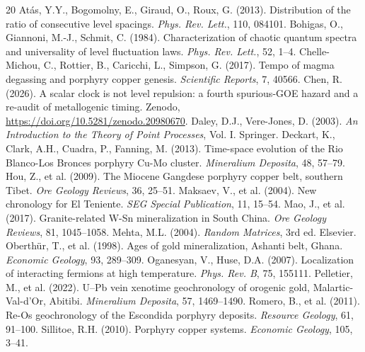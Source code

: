 \documentclass[12pt,a4paper]{article}
\begin{document}
\begin{thebibliography}{20}
 At\'as, Y.Y., Bogomolny, E., Giraud, O., Roux, G. (2013). Distribution of the ratio of consecutive level spacings. \textit{Phys. Rev. Lett.}, 110, 084101.
 Bohigas, O., Giannoni, M.-J., Schmit, C. (1984). Characterization of chaotic quantum spectra and universality of level fluctuation laws. \textit{Phys. Rev. Lett.}, 52, 1--4.
 Chelle-Michou, C., Rottier, B., Caricchi, L., Simpson, G. (2017). Tempo of magma degassing and porphyry copper genesis. \textit{Scientific Reports}, 7, 40566.
 Chen, R. (2026). A scalar clock is not level repulsion: a fourth spurious-GOE hazard and a re-audit of metallogenic timing. Zenodo, \url{https://doi.org/10.5281/zenodo.20980670}.
 Daley, D.J., Vere-Jones, D. (2003). \textit{An Introduction to the Theory of Point Processes}, Vol. I. Springer.
 Deckart, K., Clark, A.H., Cuadra, P., Fanning, M. (2013). Time-space evolution of the Rio Blanco-Los Bronces porphyry Cu-Mo cluster. \textit{Mineralium Deposita}, 48, 57--79.
 Hou, Z., et al. (2009). The Miocene Gangdese porphyry copper belt, southern Tibet. \textit{Ore Geology Reviews}, 36, 25--51.
 Maksaev, V., et al. (2004). New chronology for El Teniente. \textit{SEG Special Publication}, 11, 15--54.
 Mao, J., et al. (2017). Granite-related W-Sn mineralization in South China. \textit{Ore Geology Reviews}, 81, 1045--1058.
 Mehta, M.L. (2004). \textit{Random Matrices}, 3rd ed. Elsevier.
 Oberth\"ur, T., et al. (1998). Ages of gold mineralization, Ashanti belt, Ghana. \textit{Economic Geology}, 93, 289--309.
 Oganesyan, V., Huse, D.A. (2007). Localization of interacting fermions at high temperature. \textit{Phys. Rev. B}, 75, 155111.
 Pelletier, M., et al. (2022). U--Pb vein xenotime geochronology of orogenic gold, Malartic-Val-d'Or, Abitibi. \textit{Mineralium Deposita}, 57, 1469--1490.
 Romero, B., et al. (2011). Re-Os geochronology of the Escondida porphyry deposits. \textit{Resource Geology}, 61, 91--100.
 Sillitoe, R.H. (2010). Porphyry copper systems. \textit{Economic Geology}, 105, 3--41.

\end{thebibliography}
\end{document}
